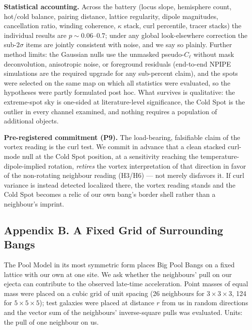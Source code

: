 \documentclass[
]{article}
\begin{document}
\textbf{Statistical accounting.} Across the battery (locus slope,
hemisphere count, hot/cold balance, pairing distance, lattice
regularity, dipole magnitudes, cancellation ratio, winding coherence,
\(\kappa\) stack, curl percentile, tracer stacks) the individual results
are \(p \sim 0.06\)--\(0.7\); under any global look-elsewhere correction
the sub-\(2\sigma\) items are jointly consistent with noise, and we say
so plainly. Further method limits: the Gaussian nulls use the unmasked
pseudo-\(C_\ell\) without mask deconvolution, anisotropic noise, or
foreground residuals (end-to-end NPIPE simulations are the required
upgrade for any sub-percent claim), and the spots were selected on the
same map on which all statistics were evaluated, so the hypotheses were
partly formulated post hoc. What survives is qualitative: the
extreme-spot sky is one-sided at literature-level significance, the Cold
Spot is the outlier in every channel examined, and nothing requires a
population of additional objects.

\textbf{Pre-registered commitment (P9).} The load-bearing, falsifiable
claim of the vortex reading is the curl test. We commit in advance that
a clean stacked curl-mode null at the Cold Spot position, at a
sensitivity reaching the temperature-dipole-implied rotation,
\emph{retires} the vortex interpretation of that direction in favor of
the non-rotating neighbour reading (H3/H6) --- not merely disfavors it.
If curl variance is instead detected localized there, the vortex reading
stands and the Cold Spot becomes a relic of our own bang's border shell
rather than a neighbour's imprint.

\hypertarget{appendix-b.-a-fixed-grid-of-surrounding-bangs}{%
\subsection{\texorpdfstring{\textbf{Appendix B. A Fixed Grid of
Surrounding
Bangs}}{Appendix B. A Fixed Grid of Surrounding Bangs}}\label{appendix-b.-a-fixed-grid-of-surrounding-bangs}}

The Pool Model in its most symmetric form places Big Pool Bangs on a
fixed lattice with our own at one site. We ask whether the neighbours'
pull on our ejecta can contribute to the observed late-time
acceleration. Point masses of equal mass were placed on a cubic grid of
unit spacing (26 neighbours for \(3\times3\times3\), 124 for
\(5\times5\times5\)); test galaxies were placed at distance \(r\) from
us in random directions and the vector sum of the neighbours'
inverse-square pulls was evaluated. Units: the pull of one neighbour on
us.
\end{document}
